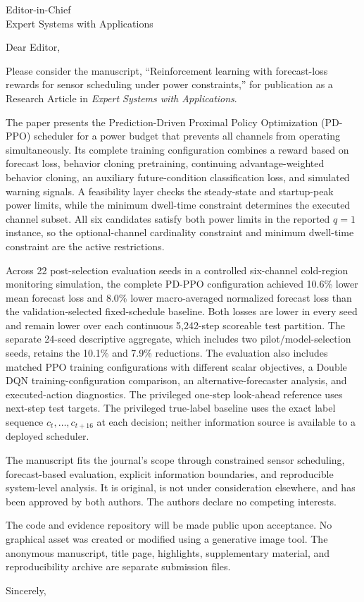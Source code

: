 \documentclass[11pt]{letter}
\begin{document}
\begin{letter}{Editor-in-Chief\\Expert Systems with Applications}
\opening{Dear Editor,}

Please consider the manuscript, ``Reinforcement learning with forecast-loss rewards for
sensor scheduling under power constraints,'' for publication as a
Research Article in \emph{Expert Systems with Applications}.

The paper presents the Prediction-Driven Proximal Policy Optimization (PD-PPO)
scheduler for a power budget that prevents all channels from operating
simultaneously. Its complete training configuration combines a
reward based on forecast loss, behavior cloning pretraining, continuing
advantage-weighted behavior cloning, an auxiliary future-condition
classification loss, and
simulated warning signals. A feasibility layer checks the steady-state and
startup-peak power limits, while the minimum dwell-time constraint
determines the executed channel subset. All six candidates satisfy both power
limits in the reported $q=1$ instance, so the optional-channel cardinality
constraint and minimum dwell-time constraint are the active restrictions.

Across 22 post-selection evaluation seeds in a controlled six-channel
cold-region monitoring simulation, the complete PD-PPO configuration achieved
10.6\% lower mean forecast loss and 8.0\% lower macro-averaged normalized
forecast loss than the validation-selected fixed-schedule baseline. Both losses are
lower in every seed and remain lower over each continuous 5,242-step scoreable
test partition. The separate 24-seed descriptive aggregate, which includes two
pilot/model-selection seeds, retains the 10.1\% and 7.9\% reductions. The
evaluation also includes matched PPO training configurations with different
scalar objectives, a Double DQN training-configuration comparison, an
alternative-forecaster analysis, and executed-action diagnostics. The
privileged one-step look-ahead reference uses next-step test targets. The
privileged true-label baseline uses the exact label sequence
$c_t,\ldots,c_{t+16}$ at each decision; neither information source is available
to a deployed scheduler.

The manuscript fits the journal's scope through constrained sensor scheduling,
forecast-based evaluation, explicit information boundaries, and reproducible
system-level analysis. It is original, is not under consideration elsewhere,
and has been approved by both authors. The authors declare no competing interests.

The code and evidence repository will be made public upon acceptance. No
graphical asset was created or modified using a generative image tool. The
anonymous manuscript, title page, highlights, supplementary material, and
reproducibility archive are separate submission files.

\closing{Sincerely,}

\end{letter}
\end{document}
